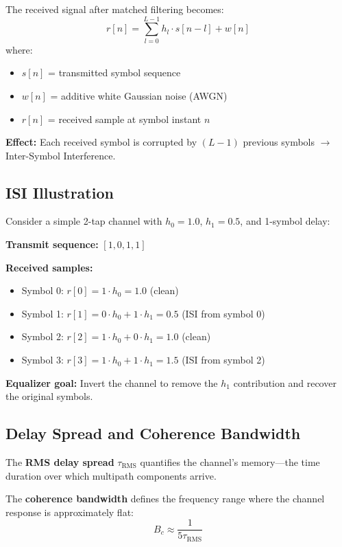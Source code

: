 The received signal after matched filtering becomes:
\begin{equation}
r[n] = \sum_{l=0}^{L-1} h_l \cdot s[n-l] + w[n]
\label{eq:received-signal-isi}
\end{equation}
where:
\begin{itemize}
\item $s[n]$ = transmitted symbol sequence
\item $w[n]$ = additive white Gaussian noise (AWGN)
\item $r[n]$ = received sample at symbol instant $n$
\end{itemize}

\textbf{Effect:} Each received symbol is corrupted by $(L-1)$ previous symbols $\rightarrow$ Inter-Symbol Interference.

\subsection{ISI Illustration}

Consider a simple 2-tap channel with $h_0 = 1.0$, $h_1 = 0.5$, and 1-symbol delay:

\textbf{Transmit sequence:} $[1, 0, 1, 1]$

\textbf{Received samples:}
\begin{itemize}
\item Symbol 0: $r[0] = 1 \cdot h_0 = 1.0$ \quad (clean)
\item Symbol 1: $r[1] = 0 \cdot h_0 + 1 \cdot h_1 = 0.5$ \quad (ISI from symbol 0)
\item Symbol 2: $r[2] = 1 \cdot h_0 + 0 \cdot h_1 = 1.0$ \quad (clean)
\item Symbol 3: $r[3] = 1 \cdot h_0 + 1 \cdot h_1 = 1.5$ \quad (ISI from symbol 2)
\end{itemize}

\textbf{Equalizer goal:} Invert the channel to remove the $h_1$ contribution and recover the original symbols.

\subsection{Delay Spread and Coherence Bandwidth}

The \textbf{RMS delay spread} $\tau_{\text{RMS}}$ quantifies the channel's memory---the time duration over which multipath components arrive.

The \textbf{coherence bandwidth} defines the frequency range where the channel response is approximately flat:
\begin{equation}
B_c \approx \frac{1}{5 \tau_{\text{RMS}}}
\label{eq:coherence-bandwidth}
\end{equation}

